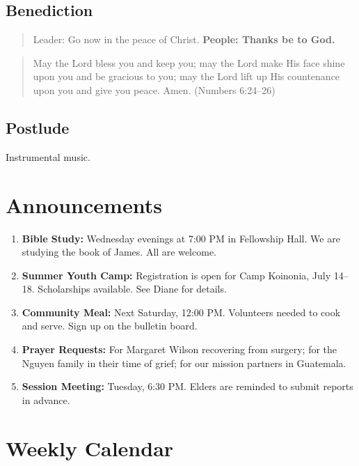 \documentclass[
    language=english,
    doctype=liturgy,
    institution=none,
]{../../omnilatex}
\begin{document}
\subsection{Benediction}
\begin{quote}
Leader: Go now in the peace of Christ.
\textbf{People: Thanks be to God.}
\end{quote}

\begin{quote}
May the Lord bless you and keep you; may the Lord make His face shine upon you and be gracious to you; may the Lord lift up His countenance upon you and give you peace. Amen. (Numbers 6:24--26)
\end{quote}

\subsection{Postlude}
Instrumental music.

\section{Announcements}

\begin{enumerate}
    \item \textbf{Bible Study:} Wednesday evenings at 7:00 PM in Fellowship Hall. We are studying the book of James. All are welcome.

    \item \textbf{Summer Youth Camp:} Registration is open for Camp Koinonia, July 14--18. Scholarships available. See Diane for details.

    \item \textbf{Community Meal:} Next Saturday, 12:00 PM. Volunteers needed to cook and serve. Sign up on the bulletin board.

    \item \textbf{Prayer Requests:} For Margaret Wilson recovering from surgery; for the Nguyen family in their time of grief; for our mission partners in Guatemala.

    \item \textbf{Session Meeting:} Tuesday, 6:30 PM. Elders are reminded to submit reports in advance.
\end{enumerate}

\section{Weekly Calendar}
\end{document}

